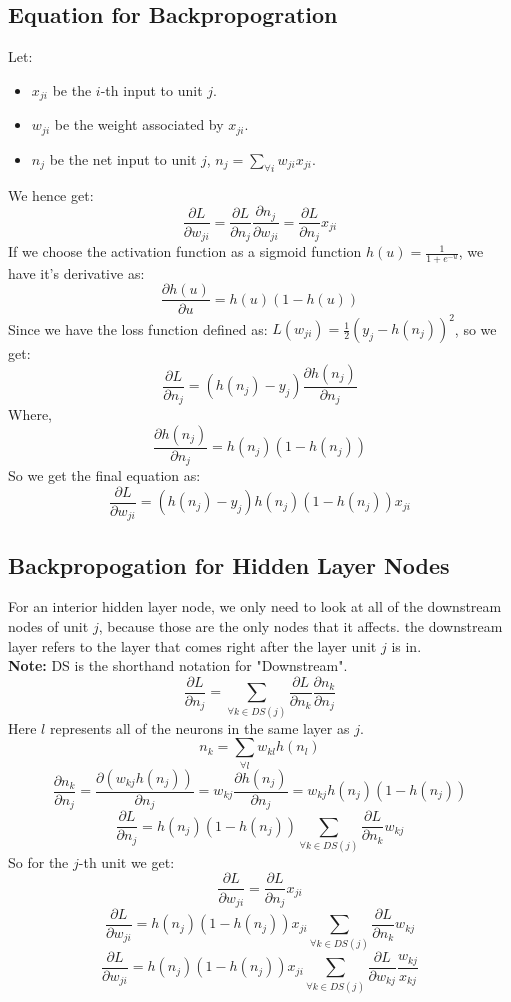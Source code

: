 \documentclass[12pt, a4paper]{book}
\begin{document}
\subsection{Equation for Backpropogration}
Let:
\begin{itemize}
    \item $x_{ji}$ be the $i$-th input to unit $j$.
    \item $w_{ji}$ be the weight associated by $x_{ji}$.
    \item $n_j$ be the net input to unit $j$, $n_j = \sum_{\forall i}w_{ji}x_{ji}$.
\end{itemize} 
We hence get:
$$\frac{\partial L}{\partial w_{ji}} = \frac{\partial L}{\partial n_j}\frac{\partial n_j}{\partial w_{ji}} = \frac{\partial L}{\partial n_j}x_{ji}$$
If we choose the activation function as a sigmoid function $h(u) = \frac{1}{1+e^{-u}}$, we have it's derivative as:
$$\frac{\partial h(u)}{\partial u} = h(u)(1-h(u))$$
Since we have the loss function defined as: $L(w_{ji}) = \frac{1}{2}\left( y_j - h(n_j)\right)^2$, so we get:
$$\frac{\partial L}{\partial n_j} = (h(n_j) - y_j)\frac{\partial h(n_j)}{\partial n_j}$$
Where,
$$\frac{\partial h(n_j)}{\partial n_j} = h(n_j)(1-h(n_j))$$
So we get the final equation as:
$$\frac{\partial L}{\partial w_{ji}} = (h(n_j) - y_j)h(n_j)(1-h(n_j))x_{ji}$$

\subsection{Backpropogation for Hidden Layer Nodes}
For an interior hidden layer node, we only need to look at all of the downstream nodes of unit $j$, because those are the only nodes that it affects. the downstream layer refers to the layer that comes right after the layer unit $j$ is in.\\
\textbf{Note:} DS is the shorthand notation for "Downstream".
$$\frac{\partial L}{\partial n_j} = \sum_{\forall k \in DS(j)}\frac{\partial L}{\partial n_k}\frac{\partial n_k}{\partial n_j}$$
Here $l$ represents all of the neurons in the same layer as $j$.
$$n_k = \sum_{\forall l}w_{kl}h(n_l)$$
$$\frac{\partial n_k}{\partial n_j} = \frac{\partial (w_{kj}h(n_j))}{\partial n_j} = w_{kj}\frac{\partial h(n_j)}{\partial n_j} = w_{kj}h(n_j)(1-h(n_j))$$
$$\frac{\partial L}{\partial n_j} = h(n_j)(1-h(n_j))\sum_{\forall k \in DS(j)}\frac{\partial L}{\partial n_k}w_{kj}$$
So for the $j$-th unit we get:
$$\frac{\partial L}{\partial w_{ji}} = \frac{\partial L}{\partial n_j}x_{ji}$$
$$\frac{\partial L}{\partial w_{ji}} = h(n_j)(1-h(n_j))x_{ji}\sum_{\forall k \in DS(j)}\frac{\partial L}{\partial n_k}w_{kj}$$
$$\frac{\partial L}{\partial w_{ji}} = h(n_j)(1-h(n_j))x_{ji}\sum_{\forall k \in DS(j)}\frac{\partial L}{\partial w_{kj}}\frac{w_{kj}}{x_{kj}}$$
\end{document}
